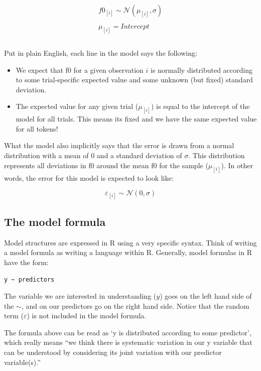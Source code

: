 \documentclass[
]{book}
\begin{document}
\begin{equation}
\begin{split}
\\
f0_{[i]} \sim \mathcal{N}(\mu_{[i]},\sigma) \\ \\ 
\mu_{[i]} = Intercept \\ \\
\end{split}
\label{eq:24}
\end{equation}

Put in plain English, each line in the model says the following:

\begin{itemize}
\item
  We expect that f0 for a given observation \(i\) is normally distributed according to some trial-specific expected value and some unknown (but fixed) standard deviation.
\item
  The expected value for any given trial (\(\mu_{[i]}\)) is equal to the intercept of the model for all trials. This means its fixed and we have the same expected value for all tokens!
\end{itemize}

What the model also implicitly says that the error is drawn from a normal distribution with a mean of 0 and a standard deviation of \(\sigma\). This distribution represents all deviations in f0 around the mean f0 for the sample (\(\mu_{[i]}\)). In other words, the error for this model is expected to look like:

\[
\varepsilon_{[i]} \sim \mathcal{N}(0,\sigma)
\label{eq:25}
\]

\hypertarget{the-model-formula}{%
\subsection{The model formula}\label{the-model-formula}}

Model structures are expressed in R using a very specific syntax. Think of writing a model formula as writing a language within R. Generally, model formulas in R have the form:

\texttt{y\ \textasciitilde{}\ predictors}

The variable we are interested in understanding (\(y\)) goes on the left hand side of the \(\sim\), and on our predictors go on the right hand side. Notice that the random term (\(\varepsilon\)) is not included in the model formula.

The formula above can be read as `y is distributed according to some predictor', which really means ``we think there is systematic variation in our y variable that can be understood by considering its joint variation with our predictor variable(s).''
\end{document}
